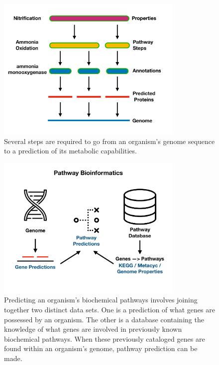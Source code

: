 \begin{figure}[!ht]
  \centering
	\includegraphics[width=0.8\textwidth]{media/pathway_analysis_steps.pdf}
	 \caption{Several steps are required to go from an organism's genome sequence to a prediction of its metabolic capabilities.}
	 \label{fig:pathway-analysis-steps}
\end{figure}

\begin{figure}[!ht]
  \centering
	\includegraphics[width=0.8\textwidth]{media/pathway_bioinformatics.pdf}
	 \caption{Predicting an organism's biochemical pathways involves joining together two distinct data sets. One is a prediction of what genes are possessed by an organism. The other is a database containing the knowledge of what genes are involved in previously known biochemical pathways. When these previously cataloged genes are found within an organism's genome, pathway prediction can be made.}
	 \label{fig:pathway-analysis-overview}
\end{figure}

